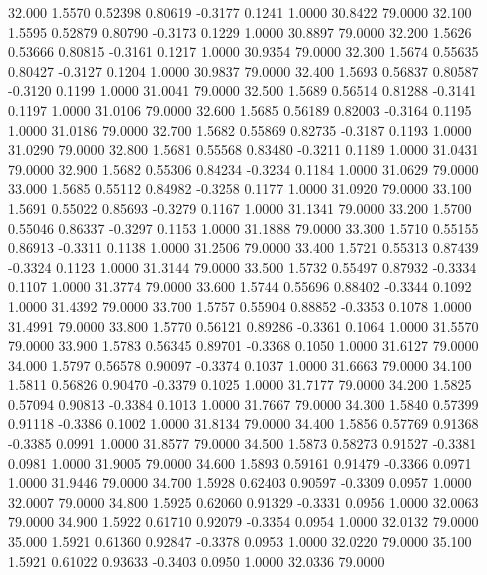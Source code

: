   32.000   1.5570   0.52398   0.80619  -0.3177   0.1241   1.0000  30.8422  79.0000
  32.100   1.5595   0.52879   0.80790  -0.3173   0.1229   1.0000  30.8897  79.0000
  32.200   1.5626   0.53666   0.80815  -0.3161   0.1217   1.0000  30.9354  79.0000
  32.300   1.5674   0.55635   0.80427  -0.3127   0.1204   1.0000  30.9837  79.0000
  32.400   1.5693   0.56837   0.80587  -0.3120   0.1199   1.0000  31.0041  79.0000
  32.500   1.5689   0.56514   0.81288  -0.3141   0.1197   1.0000  31.0106  79.0000
  32.600   1.5685   0.56189   0.82003  -0.3164   0.1195   1.0000  31.0186  79.0000
  32.700   1.5682   0.55869   0.82735  -0.3187   0.1193   1.0000  31.0290  79.0000
  32.800   1.5681   0.55568   0.83480  -0.3211   0.1189   1.0000  31.0431  79.0000
  32.900   1.5682   0.55306   0.84234  -0.3234   0.1184   1.0000  31.0629  79.0000
  33.000   1.5685   0.55112   0.84982  -0.3258   0.1177   1.0000  31.0920  79.0000
  33.100   1.5691   0.55022   0.85693  -0.3279   0.1167   1.0000  31.1341  79.0000
  33.200   1.5700   0.55046   0.86337  -0.3297   0.1153   1.0000  31.1888  79.0000
  33.300   1.5710   0.55155   0.86913  -0.3311   0.1138   1.0000  31.2506  79.0000
  33.400   1.5721   0.55313   0.87439  -0.3324   0.1123   1.0000  31.3144  79.0000
  33.500   1.5732   0.55497   0.87932  -0.3334   0.1107   1.0000  31.3774  79.0000
  33.600   1.5744   0.55696   0.88402  -0.3344   0.1092   1.0000  31.4392  79.0000
  33.700   1.5757   0.55904   0.88852  -0.3353   0.1078   1.0000  31.4991  79.0000
  33.800   1.5770   0.56121   0.89286  -0.3361   0.1064   1.0000  31.5570  79.0000
  33.900   1.5783   0.56345   0.89701  -0.3368   0.1050   1.0000  31.6127  79.0000
  34.000   1.5797   0.56578   0.90097  -0.3374   0.1037   1.0000  31.6663  79.0000
  34.100   1.5811   0.56826   0.90470  -0.3379   0.1025   1.0000  31.7177  79.0000
  34.200   1.5825   0.57094   0.90813  -0.3384   0.1013   1.0000  31.7667  79.0000
  34.300   1.5840   0.57399   0.91118  -0.3386   0.1002   1.0000  31.8134  79.0000
  34.400   1.5856   0.57769   0.91368  -0.3385   0.0991   1.0000  31.8577  79.0000
  34.500   1.5873   0.58273   0.91527  -0.3381   0.0981   1.0000  31.9005  79.0000
  34.600   1.5893   0.59161   0.91479  -0.3366   0.0971   1.0000  31.9446  79.0000
  34.700   1.5928   0.62403   0.90597  -0.3309   0.0957   1.0000  32.0007  79.0000
  34.800   1.5925   0.62060   0.91329  -0.3331   0.0956   1.0000  32.0063  79.0000
  34.900   1.5922   0.61710   0.92079  -0.3354   0.0954   1.0000  32.0132  79.0000
  35.000   1.5921   0.61360   0.92847  -0.3378   0.0953   1.0000  32.0220  79.0000
  35.100   1.5921   0.61022   0.93633  -0.3403   0.0950   1.0000  32.0336  79.0000
